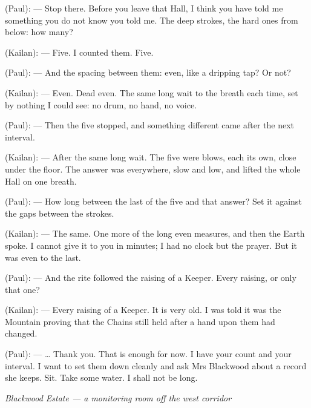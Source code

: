 \begin{room}

(Paul): --- Stop there. Before you leave that Hall, I think you have told me something you do not know you told me. The deep strokes, the hard ones from below: how many?

(Kailan): --- Five. I counted them. Five.

(Paul): --- And the spacing between them: even, like a dripping tap? Or not?

(Kailan): --- Even. Dead even. The same long wait to the breath each time, set by nothing I could see: no drum, no hand, no voice.

(Paul): --- Then the five stopped, and something different came after the next interval.

(Kailan): --- After the same long wait. The five were blows, each its own, close under the floor. The answer was everywhere, slow and low, and lifted the whole Hall on one breath.

(Paul): --- How long between the last of the five and that answer? Set it against the gaps between the strokes.

(Kailan): --- The same. One more of the long even measures, and then the Earth spoke. I cannot give it to you in minutes; I had no clock but the prayer. But it was even to the last.

(Paul): --- And the rite followed the raising of a Keeper. Every raising, or only that one?

(Kailan): --- Every raising of a Keeper. It is very old. I was told it was the Mountain proving that the Chains still held after a hand upon them had changed.

(Paul): --- \ldots{} Thank you. That is enough for now. I have your count and your interval. I want to set them down cleanly and ask Mrs Blackwood about a record she keeps. Sit. Take some water. I shall not be long.

\end{room}

\begin{center}\small\itshape Blackwood Estate --- a monitoring room off the west corridor\end{center}

